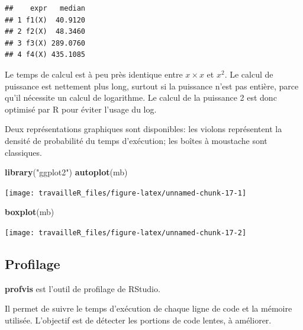 \documentclass[
  12pt,
  french,
  a4paper,
  extrafontsizes,onecolumn,openright
  ]{memoir}
\newenvironment{Shaded}{\begin{snugshade}}{\end{snugshade}}
\newcommand{\KeywordTok}[1]{\textcolor[rgb]{0.13,0.29,0.53}{\textbf{#1}}}
\newcommand{\NormalTok}[1]{#1}
\newcommand{\StringTok}[1]{\textcolor[rgb]{0.31,0.60,0.02}{#1}}
\begin{document}
\begin{verbatim}
##    expr   median
## 1 f1(X)  40.9120
## 2 f2(X)  48.3460
## 3 f3(X) 289.0760
## 4 f4(X) 435.1085
\end{verbatim}

\normalsize

Le temps de calcul est à peu près identique entre \(x \times x\) et \(x^2\).
Le calcul de puissance est nettement plus long, surtout si la puissance n'est pas entière, parce qu'il nécessite un calcul de logarithme.
Le calcul de la puissance 2 est donc optimisé par R pour éviter l'usage du log.

Deux représentations graphiques sont disponibles: les violons représentent la densité de probabilité du temps d'exécution; les boîtes à moustache sont classiques.

\scriptsize

\begin{Shaded}
\begin{Highlighting}[]
\KeywordTok{library}\NormalTok{(}\StringTok{"ggplot2"}\NormalTok{)}
\KeywordTok{autoplot}\NormalTok{(mb)}
\end{Highlighting}
\end{Shaded}

\begin{center}\texttt{[image: travailleR\_files/figure-latex/unnamed-chunk-17-1]} \end{center}

\begin{Shaded}
\begin{Highlighting}[]
\KeywordTok{boxplot}\NormalTok{(mb)}
\end{Highlighting}
\end{Shaded}

\begin{center}\texttt{[image: travailleR\_files/figure-latex/unnamed-chunk-17-2]} \end{center}

\normalsize

\hypertarget{profilage}{%
\subsection{Profilage}\label{profilage}}

\textbf{profvis} est l'outil de profilage de RStudio.

Il permet de suivre le temps d'exécution de chaque ligne de code et la mémoire utilisée.
L'objectif est de détecter les portions de code lentes, à améliorer.
\end{document}
